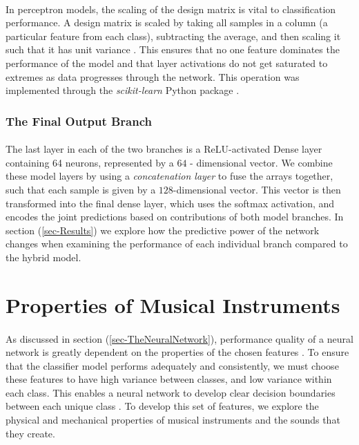 \documentclass[12pt,letterpaper]{article}
\begin{document}
\paragraph*{}In perceptron models, the scaling of the design matrix is vital to classification performance. A design matrix is scaled by taking all samples in a column (a particular feature from each class), subtracting the average, and then scaling it such that it has unit variance \cite{Geron,James}. This ensures that no one feature dominates the performance of the model and that layer activations do not get saturated to extremes as data progresses through the network. This operation was implemented through the \textit{scikit-learn} Python package \cite{Sklearn}.


\subsubsection{The Final Output Branch}

\paragraph*{}The last layer in each of the two branches is a ReLU-activated Dense layer containing 64 neurons, represented by a $64$ - dimensional vector. We combine these model layers by using a \textit{concatenation layer} to fuse the arrays together, such that each sample is given by a $128$-dimensional vector. This vector is then transformed into the final dense layer, which uses the softmax activation, and encodes the joint predictions based on contributions of both model branches. In section (\ref{sec-Results}) we explore how the predictive power of the network changes when examining the performance of each individual branch compared to the hybrid model.


\newpage
\section{Properties of Musical Instruments}
\label{sec-Instruments}

\paragraph*{}As discussed in section (\ref{sec-TheNeuralNetwork}), performance quality of a neural network is greatly dependent on the properties of the chosen features \cite{Virtanen,Liu}. To ensure that the classifier model performs adequately and consistently, we must choose these features to have high variance between classes, and low variance within each class. This enables a neural network to develop clear decision boundaries between each unique class \cite{James,Serizel}. To develop this set of features, we explore the physical and mechanical properties of musical instruments and the sounds that they create.
\end{document}
